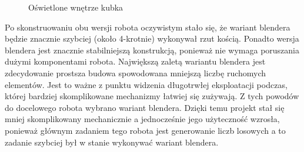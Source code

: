 \begin{figure}[H]
    \centering
    \caption{\label{fig:jasno}Oświetlone wnętrze kubka}
\end{figure}

Po skonstruowaniu obu wersji robota oczywistym stało się, że wariant blendera będzie znacznie szybciej (około 4-krotnie) wykonywał rzut kością.
Ponadto wersja blendera jest znacznie stabilniejszą konstrukcją, ponieważ nie wymaga poruszania dużymi komponentami robota. 
Największą zaletą wariantu blendera jest zdecydowanie prostsza budowa spowodowana mniejszą liczbę ruchomych elementów. Jest to ważne z punktu widzenia
długotrwłej eksploatacji podczas, której bardziej skomplikowane mechanizmy łatwiej się zużywają. Z tych powodów do docelowego robota wybrano 
wariant blendera. Dzięki temu projekt stał się mniej skomplikowany mechanicznie a jednocześnie jego użyteczność wzrosła, ponieważ
głównym zadaniem tego robota jest generowanie liczb losowych a to zadanie szybciej był w stanie wykonywać wariant blendera.

